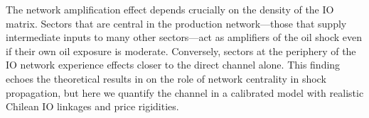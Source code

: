 The network amplification effect depends crucially on the density of the IO matrix.
Sectors that are central in the production network---those that supply intermediate inputs to many other sectors---act as amplifiers of the oil shock even if their own oil exposure is moderate.
Conversely, sectors at the periphery of the IO network experience effects closer to the direct channel alone.
This finding echoes the theoretical results in \citet{baqaee2019macroeconomic} on the role of network centrality in shock propagation, but here we quantify the channel in a calibrated model with realistic Chilean IO linkages and price rigidities.
